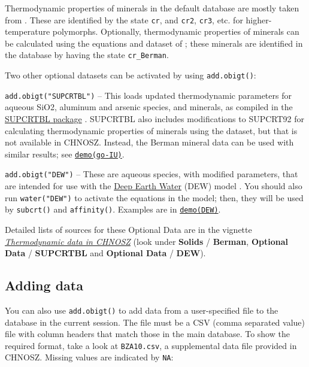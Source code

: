 \documentclass[]{tufte-handout}
\begin{document}
Thermodynamic properties of minerals in the default database are mostly
taken from \citet{HDNB78}. These are identified by the state
\texttt{cr}, and \texttt{cr2}, \texttt{cr3}, etc. for higher-temperature
polymorphs. Optionally, thermodynamic properties of minerals can be
calculated using the equations and dataset of \citet{Ber88}; these
minerals are identified in the database by having the state
\texttt{cr\_Berman}.

Two other optional datasets can be activated by using
{\texttt{add.obigt()}}:

{\texttt{add.obigt("SUPCRTBL")}} -- This loads updated thermodynamic
parameters for aqueous SiO2, aluminum and arsenic species, and minerals,
as compiled in the
\href{http://www.indiana.edu/~hydrogeo/supcrtbl.html}{SUPCRTBL package}
\citep{ZZL_16}. SUPCRTBL also includes modifications to SUPCRT92 for
calculating thermodynamic properties of minerals using the \citet{HP11}
dataset, but that is not available in CHNOSZ. Instead, the Berman
mineral data can be used with similar results; see
\href{../demo}{{\texttt{demo(go-IU)}}}.

{\texttt{add.obigt("DEW")}} -- These are aqueous species, with modified
parameters, that are intended for use with the
\href{http://www.dewcommunity.org/}{Deep Earth Water} (DEW) model
\citep{SHA14}. You should also run {\texttt{water("DEW")}} to activate
the equations in the model; then, they will be used by
{\texttt{subcrt()}} and {\texttt{affinity()}}. Examples are in
\href{../demo}{{\texttt{demo(DEW)}}}.

Detailed lists of sources for these Optional Data are in the vignette
\href{obigt.html}{{\emph{Thermodynamic data in CHNOSZ}}} (look under
\textbf{Solids} / \textbf{Berman}, \textbf{Optional Data} /
\textbf{SUPCRTBL} and \textbf{Optional Data} / \textbf{DEW}).

\hypertarget{adding-data}{\subsection{Adding data}\label{adding-data}}

You can also use {\texttt{add.obigt()}} to add data from a
user-specified file to the database in the current session. The file
must be a CSV (comma separated value) file with column headers that
match those in the main database. To show the required format, take a
look at \texttt{BZA10.csv}, a supplemental data file provided in CHNOSZ.
Missing values are indicated by \texttt{NA}:
\end{document}
